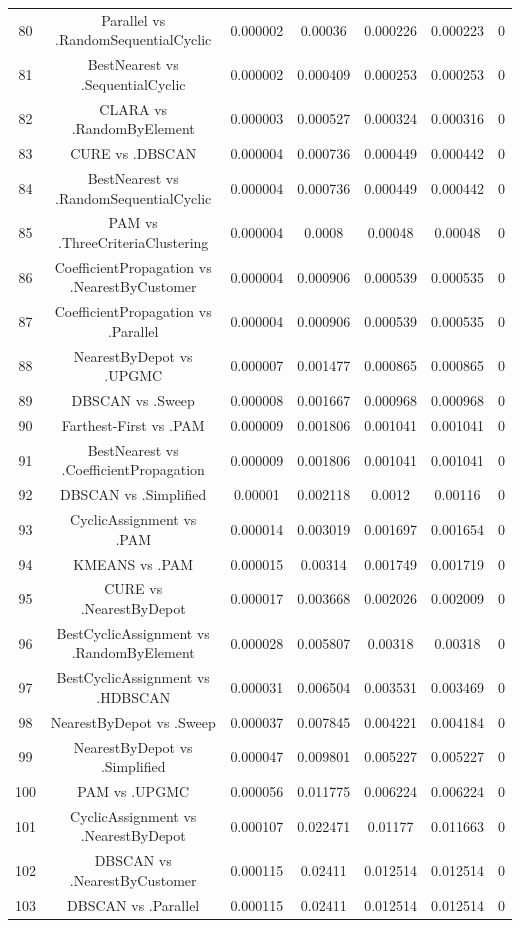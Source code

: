 \documentclass[a4paper,10pt]{article}
\begin{document}
\begin{landscape}
\begin{table}[!htp]
\begin{tabular}{ccccccc}
80&Parallel vs .RandomSequentialCyclic&0.000002&0.00036&0.000226&0.000223&0\\
81&BestNearest vs .SequentialCyclic&0.000002&0.000409&0.000253&0.000253&0\\
82&CLARA vs .RandomByElement&0.000003&0.000527&0.000324&0.000316&0\\
83&CURE vs .DBSCAN&0.000004&0.000736&0.000449&0.000442&0\\
84&BestNearest vs .RandomSequentialCyclic&0.000004&0.000736&0.000449&0.000442&0\\
85&PAM vs .ThreeCriteriaClustering&0.000004&0.0008&0.00048&0.00048&0\\
86&CoefficientPropagation vs .NearestByCustomer&0.000004&0.000906&0.000539&0.000535&0\\
87&CoefficientPropagation vs .Parallel&0.000004&0.000906&0.000539&0.000535&0\\
88&NearestByDepot vs .UPGMC&0.000007&0.001477&0.000865&0.000865&0\\
89&DBSCAN vs .Sweep&0.000008&0.001667&0.000968&0.000968&0\\
90&Farthest-First vs .PAM&0.000009&0.001806&0.001041&0.001041&0\\
91&BestNearest vs .CoefficientPropagation&0.000009&0.001806&0.001041&0.001041&0\\
92&DBSCAN vs .Simplified&0.00001&0.002118&0.0012&0.00116&0\\
93&CyclicAssignment vs .PAM&0.000014&0.003019&0.001697&0.001654&0\\
94&KMEANS vs .PAM&0.000015&0.00314&0.001749&0.001719&0\\
95&CURE vs .NearestByDepot&0.000017&0.003668&0.002026&0.002009&0\\
96&BestCyclicAssignment vs .RandomByElement&0.000028&0.005807&0.00318&0.00318&0\\
97&BestCyclicAssignment vs .HDBSCAN&0.000031&0.006504&0.003531&0.003469&0\\
98&NearestByDepot vs .Sweep&0.000037&0.007845&0.004221&0.004184&0\\
99&NearestByDepot vs .Simplified&0.000047&0.009801&0.005227&0.005227&0\\
100&PAM vs .UPGMC&0.000056&0.011775&0.006224&0.006224&0\\
101&CyclicAssignment vs .NearestByDepot&0.000107&0.022471&0.01177&0.011663&0\\
102&DBSCAN vs .NearestByCustomer&0.000115&0.02411&0.012514&0.012514&0\\
103&DBSCAN vs .Parallel&0.000115&0.02411&0.012514&0.012514&0\\

\end{tabular}
\end{table}
\end{landscape}
\end{document}
